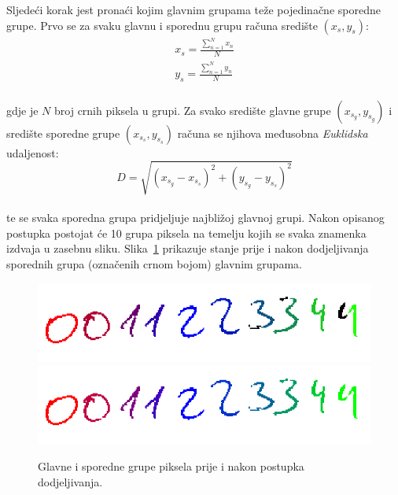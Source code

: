 Sljedeći korak jest pronaći kojim glavnim grupama teže pojedinačne sporedne grupe. Prvo se za svaku glavnu i sporednu
grupu računa središte $(x_s, y_s)$:\\
\begin{align*}
    x_s = \frac{\sum_{n = 1}^{N} x_n}{N}\\
    y_s = \frac{\sum_{n = 1}^{N} y_n}{N}
\end{align*}\\
gdje je $N$ broj crnih piksela u grupi. Za svako središte glavne grupe $(x_{s_g}, y_{s_g})$ i središte sporedne grupe
$(x_{s_s}, y_{s_s})$ računa se njihova međusobna \emph{Euklidska} udaljenost:\\
\begin{equation*}
    D = \sqrt{(x_{s_g} - x_{s_s})^{2} + (y_{s_g} - y_{s_s})^{2}}
\end{equation*}\\
te se svaka sporedna grupa pridjeljuje najbližoj glavnoj grupi. Nakon opisanog postupka postojat će 10 grupa piksela
na temelju kojih se svaka znamenka izdvaja u zasebnu sliku. Slika\ \ref{fig:assigned-minor-groups} prikazuje stanje
prije i nakon dodjeljivanja sporednih grupa (označenih crnom bojom) glavnim grupama.
\begin{figure}[htb]
    \centering
    \includegraphics[width=12cm]{images/chapter4/unassigned-minor-groups.png}
    \includegraphics[width=12cm]{images/chapter4/assigned-minor-groups.png}
    \caption{Glavne i sporedne grupe piksela prije i nakon postupka dodjeljivanja.}
    \label{fig:assigned-minor-groups}
\end{figure}


